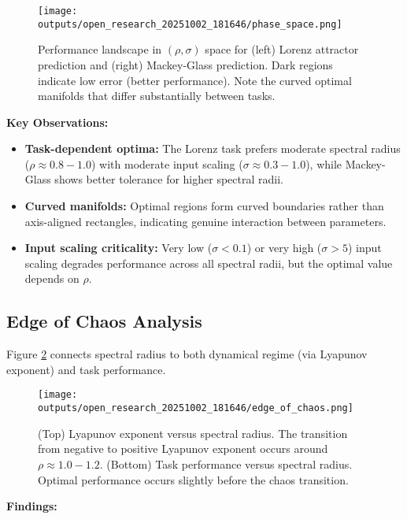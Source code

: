 \documentclass[11pt]{article}
\begin{document}
\begin{figure}[h]
    \centering
    \texttt{[image: outputs/open\_research\_20251002\_181646/phase\_space.png]}
    \caption{Performance landscape in $(\rho, \sigma)$ space for (left) Lorenz attractor prediction and (right) Mackey-Glass prediction. Dark regions indicate low error (better performance). Note the curved optimal manifolds that differ substantially between tasks.}
    \label{fig:phase_space}
\end{figure}

\textbf{Key Observations:}

\begin{itemize}
    \item \textbf{Task-dependent optima:} The Lorenz task prefers moderate spectral radius ($\rho \approx 0.8-1.0$) with moderate input scaling ($\sigma \approx 0.3-1.0$), while Mackey-Glass shows better tolerance for higher spectral radii.
    
    \item \textbf{Curved manifolds:} Optimal regions form curved boundaries rather than axis-aligned rectangles, indicating genuine interaction between parameters.
    
    \item \textbf{Input scaling criticality:} Very low ($\sigma < 0.1$) or very high ($\sigma > 5$) input scaling degrades performance across all spectral radii, but the optimal value depends on $\rho$.
\end{itemize}

\subsection{Edge of Chaos Analysis}

Figure \ref{fig:eoc} connects spectral radius to both dynamical regime (via Lyapunov exponent) and task performance.

\begin{figure}[h]
    \centering
    \texttt{[image: outputs/open\_research\_20251002\_181646/edge\_of\_chaos.png]}
    \caption{(Top) Lyapunov exponent versus spectral radius. The transition from negative to positive Lyapunov exponent occurs around $\rho \approx 1.0-1.2$. (Bottom) Task performance versus spectral radius. Optimal performance occurs slightly before the chaos transition.}
    \label{fig:eoc}
\end{figure}

\textbf{Findings:}
\end{document}
